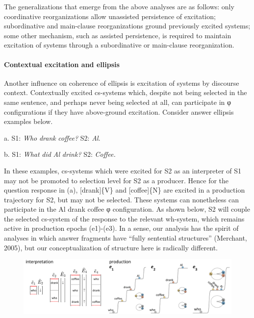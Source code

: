   The generalizations that emerge from the above analyses are as follows: only coordinative reorganizations allow unassisted persistence of excitation; subordinative and main-clause reorganizations ground previously excited systems; some other mechanism, such as assisted persistence, is required to maintain excitation of systems through a subordinative or main-clause reorganization. 

\paragraph{Contextual excitation and ellipsis}

Another influence on coherence of ellipsis is excitation of systems by discourse context. Contextually excited cs-systems which, despite not being selected in the same sentence, and perhaps never being selected at all, can participate in φ configurations if they have above-ground excitation. Consider answer ellipsis examples below.

    a.    S1: \textit{Who} \textit{drank} \textit{coffee?}  S2: \textit{Al}.

     b.    S1: \textit{What} \textit{did} \textit{Al} \textit{drink?}   S2: \textit{Coffee.}

  In these examples, cs-systems which were excited for S2 as an interpreter of S1 may not be promoted to selection level for S2 as a producer. Hence for the question response in (a), [drank]\{V\} and [coffee]\{N\} are excited in a production trajectory for S2, but may not be selected. These systems can nonetheless can participate in the {\textbar}Al drank coffee{\textbar} φ configuration. As shown below, S2 will couple the selected cs-system of the response to the relevant wh-system, which remains active in production epochs (e1)-(e3). In a sense, our analysis has the spirit of analyses in which answer fragments have “fully sentential structures”  (Merchant, 2005), but our conceptualization of structure here is radically different.

  
\begin{figure}
\includegraphics[width=\textwidth]{figures/Tilsen-img151.png}
\caption{\missingcaption}
\label{fig:}
\end{figure}
 

